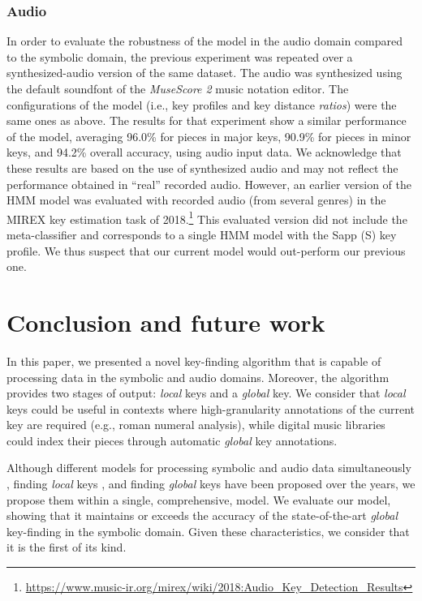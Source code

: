 \documentclass[sigconf]{acmart}
\begin{document}
\subsubsection{Audio}
In order to evaluate the robustness of the model in the audio domain compared to the symbolic domain, the previous experiment was repeated over a synthesized-audio version of the same dataset. The audio was synthesized using the default soundfont of the \emph{MuseScore 2} music notation editor. The configurations of the model (i.e., key profiles and key distance \emph{ratios}) were the same ones as above. The results for that experiment show a similar performance of the model, averaging 96.0\% for pieces in major keys, 90.9\% for pieces in minor keys, and 94.2\% overall accuracy, using audio input data. We acknowledge that these results are based on the use of synthesized audio and may not reflect the performance obtained in ``real'' recorded audio. However, an earlier version of the HMM model was evaluated with recorded audio (from several genres) in the MIREX key estimation task of 2018.\footnote{\url{https://www.music-ir.org/mirex/wiki/2018:Audio_Key_Detection_Results}} This evaluated version did not include the meta-classifier and corresponds to a single HMM model with the Sapp (S) key profile. We thus suspect that our current model would out-perform our previous one.

\section{Conclusion and future work}
In this paper, we presented a novel key-finding algorithm that is capable of processing data in the symbolic and audio domains. Moreover, the algorithm  provides two stages of output: \emph{local} keys and a \emph{global} key. We consider that \emph{local} keys could be useful in contexts where high-granularity annotations of the current key are required (e.g., roman numeral analysis), while digital music libraries could index their 
pieces through automatic \emph{global} key annotations.

Although different models for processing symbolic and audio data simultaneously \cite{pickens2003, toiviainen_visualization_2007, tzanetakis_pitch_2002, collins_bridging_2014}, finding \emph{local} keys \cite{papadopoulos2009}, and finding \emph{global} keys \cite{albrecht2013use, korzeniowski017} have been proposed over the years, we propose them within a single, comprehensive, model. We evaluate our model, showing that it maintains or exceeds the accuracy of the state-of-the-art \emph{global} key-finding in the symbolic domain. Given these characteristics, we consider that it is the first of its kind. 
\end{document}
